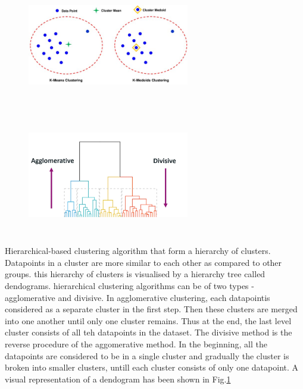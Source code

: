 {\begin{figure}
    \centering
    \begin{minipage}[t]{.45\textwidth}
      \centering
      \includegraphics[width=200pt,height=150pt]{pictures/The-graphical-representation-of-the-difference-between-the-k-means-and-k-medoids_W640.jpg}
      \label{fig:kmean-kmedoid}
    \end{minipage}%
    \hspace{1cm}
    \begin{minipage}[t]{.45\textwidth}
      \centering
      \includegraphics[width=200pt,height=150pt]{pictures/dendogram.png}
      \label{fig:dendogram}
    \end{minipage}
\end{figure}

Hierarchical-based clustering algorithm that form a hierarchy of clusters. Datapoints in a cluster are more similar to each other as compared to other groups. this hierarchy of clusters is visualised by a hierarchy tree called dendograms. hierarchical clustering algorithms can be of two types - agglomerative and divisive. In agglomerative clustering, each datapointis considered as a separate cluster in the first step. Then these clusters are merged into one another until only one cluster remains. Thus at the end, the last level cluster consists of all teh datapoints in the dataset. The divisive method is the reverse procedure of the aggomerative method. In the beginning, all the datapoints are considered to be in a single cluster and gradually the cluster is broken into smaller clusters, untill each cluster consists of only one datapoint. A visual representation of a dendogram has been shown in Fig.\ref*{fig:dendogram}

}
